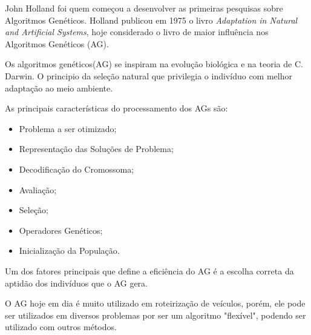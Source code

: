 John Holland foi quem começou a desenvolver as primeiras pesquisas sobre Algoritmos Genéticos. Holland publicou em 
1975 o livro \textit{Adaptation in Natural and Artificial Systems}, hoje considerado o livro de maior influência nos
Algoritmos Genéticos (AG). 

Os algoritmos genéticos(AG) se inspiram na evolução biológica e na teoria de C. Darwin. O principio da seleção natural que privilegia o indivíduo com melhor adaptação ao meio ambiente.

As principais características do processamento dos AGs são:
\begin{itemize}
	\item Problema a ser otimizado;
	\item Representação das Soluções de Problema;
	\item Decodificação do Cromossoma;
	\item Avaliação;
	\item Seleção;
	\item Operadores Genéticos;
	\item Inicialização da População.
\end{itemize}


Um dos fatores principais que define a eficiência do AG é a escolha correta da aptidão dos indivíduos que o AG gera.

O AG hoje em dia é muito utilizado em roteirização de veículos, porém, ele pode ser utilizados em diversos problemas por ser um algoritmo "flexível", podendo ser utilizado com outros métodos.

